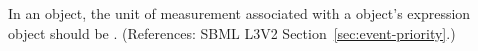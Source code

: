 In an \Event object, the unit of measurement associated with a \Priority
object's  expression object should be .  (References:
SBML L3V2 Section~\ref{sec:event-priority}.)
